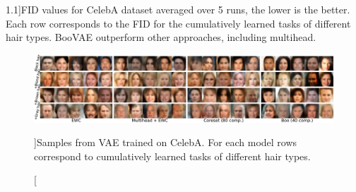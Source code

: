 \begin{table}[t]
\caption[][1.1\baselineskip]{FID values for CelebA dataset averaged over 5 runs, the lower is the better. Each row corresponds to the FID for the cumulatively learned tasks of different hair types. BooVAE outperform other approaches, including multihead.}
\label{tab:celeba_fid}
\begin{center}
    \vspace*{10pt}
\end{center}
\end{table}

\begin{figure}[t]
	     \vspace*{10pt}
		\centering
		\includegraphics[width=1.\textwidth]{pics/1_boovae/CELEBAGEN.pdf}
	\caption[][\baselineskip]{Samples from VAE trained on CelebA. For each model rows correspond to cumulatively learned tasks of different hair types.}
	\label{fig:CELEBAGEN}
\end{figure}
